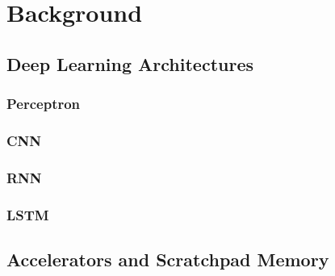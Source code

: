 
\chapter{Background} %

\label{Chapter1} %


\section{Deep Learning Architectures}

\subsection{Perceptron}

\subsection{CNN}


\subsection{RNN}



\subsection{LSTM}

\section{Accelerators and Scratchpad Memory}

